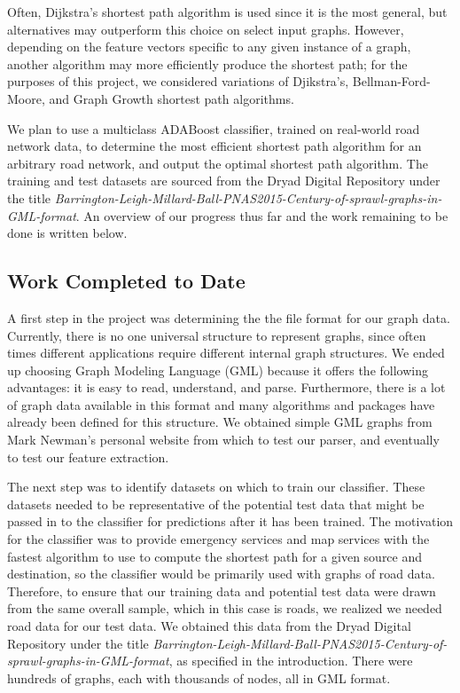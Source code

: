 \documentclass{article}
\begin{document}
Often, Dijkstra’s shortest path algorithm is used since it is the most general, but alternatives may outperform this choice on select input graphs. However, depending on the feature vectors specific to any given instance of a graph, another algorithm may more efficiently produce the shortest path; for the purposes of this project, we considered variations of Djikstra’s, Bellman-Ford-Moore, and Graph Growth shortest path algorithms. 

We plan to use a multiclass ADABoost classifier, trained on real-world road network data, to determine the most efficient shortest path algorithm for an arbitrary road network, and output the optimal shortest path algorithm. The training and test datasets are sourced from the Dryad Digital Repository under the title \textit{Barrington-Leigh-Millard-Ball-PNAS2015-Century-of-sprawl-graphs-in-GML-format}. An overview of our progress thus far and the work remaining to be done is written below.

\subsection{Work Completed to Date}

A first step in the project was determining the the file format for our graph data. Currently, there is no one universal structure to represent graphs, since often times different applications require different internal graph structures. We ended up choosing Graph Modeling Language (GML) because it offers the following advantages: it is easy to read, understand, and parse. Furthermore, there is a lot of graph data available in this format and many algorithms and packages have already been defined for this structure. We obtained simple GML graphs from Mark Newman's personal website  from which to test our parser, and eventually to test our feature extraction. 

The next step was to identify datasets on which to train our classifier. These datasets needed to be representative of the potential test data that might be passed in to the classifier for predictions after it has been trained. The motivation for the classifier was to provide emergency services and map services with the fastest algorithm to use to compute the shortest path for a given source and destination, so the classifier would be primarily used with graphs of road data. Therefore, to ensure that our training data and potential test data were drawn from the same overall sample, which in this case is roads, we realized we needed road data for our test data. We obtained this data from the Dryad Digital Repository under the title \textit{Barrington-Leigh-Millard-Ball-PNAS2015-Century-of-sprawl-graphs-in-GML-format}, as specified in the introduction. There were hundreds of graphs, each with thousands of nodes, all in GML format.
\end{document}
